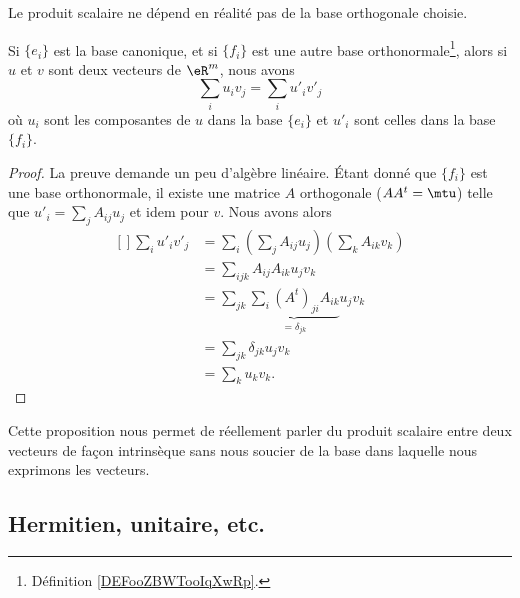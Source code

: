 Le produit scalaire ne dépend en réalité pas de la base orthogonale choisie.

\begin{lemma}       \label{LEMooZMCWooDfbrIq}
	Si \( \{ e_i \}\) est la base canonique, et si \( \{ f_i \}\) est une autre base orthonormale\footnote{Définition \ref{DEFooZBWTooIqXwRp}.}, alors si \( u\) et \( v\) sont deux vecteurs de \( \eR^m\), nous avons
	\begin{equation}
		\sum_i u_iv_j=\sum_iu'_iv'_j
	\end{equation}
	où \( u_i\) sont les composantes de \( u\) dans la base \( \{ e_i \}\) et \( u'_i\) sont celles dans la base \( \{ f_i \}\).
\end{lemma}

\begin{proof}
	La preuve demande un peu d'algèbre linéaire. Étant donné que \( \{ f_i \}\) est une base orthonormale, il existe une matrice \( A\) orthogonale (\( AA^t=\mtu\)) telle que \( u'_i=\sum_jA_{ij}u_j\) et idem pour \( v\). Nous avons alors
	\begin{equation}
		\begin{aligned}[]
			\sum_iu'_iv'_j & =\sum_i\left( \sum_jA_{ij} u_j\right)\left( \sum_k A_{ik}v_k \right) \\
			               & =\sum_{ijk}A_{ij}A_{ik}u_jv_k                                        \\
			               & =\sum_{jk}\underbrace{\sum_i(A^t)_{ji}A_{ik}}_{=\delta_{jk}}u_jv_k   \\
			               & =\sum_{jk}\delta_{jk}u_jv_k                                          \\
			               & =\sum_ku_kv_k.
		\end{aligned}
	\end{equation}
\end{proof}

Cette proposition nous permet de réellement parler du produit scalaire entre deux vecteurs de façon intrinsèque sans nous soucier de la base dans laquelle nous exprimons les vecteurs.

\subsection{Hermitien, unitaire, etc.}

